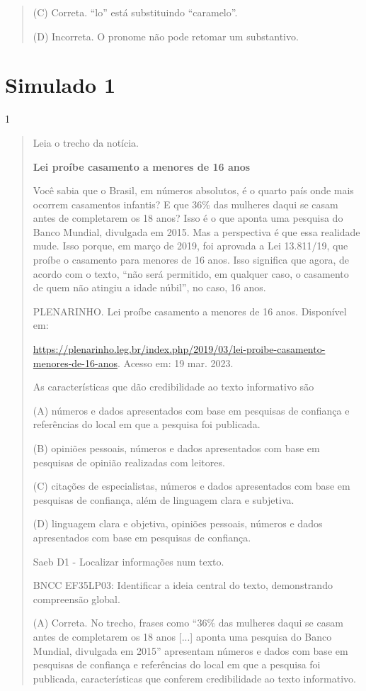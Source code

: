 \begin{escolha}
\begin{quote}
(C) Correta. ``lo'' está substituindo ``caramelo''.

(D) Incorreta. O pronome não pode retomar um substantivo.
\end{quote}

\chapter{Simulado 1}

\num{1}

\begin{quote}
Leia o trecho da notícia.

\textbf{Lei proíbe casamento a menores de 16 anos}

Você sabia que o Brasil, em números absolutos, é o quarto país onde mais
ocorrem casamentos infantis? E que 36\% das mulheres daqui se casam
antes de completarem os 18 anos? Isso é o que aponta uma pesquisa do
Banco Mundial, divulgada em 2015. Mas a perspectiva é que essa realidade
mude. Isso porque, em março de 2019, foi aprovada a Lei 13.811/19, que
proíbe o casamento para menores de 16 anos. Isso significa que agora, de
acordo com o texto, ``não será permitido, em qualquer caso, o casamento
de quem não atingiu a idade núbil'', no caso, 16 anos.

PLENARINHO. Lei proíbe casamento a menores de 16 anos. Disponível em:

\url{https://plenarinho.leg.br/index.php/2019/03/lei-proibe-casamento-menores-de-16-anos}.
Acesso em: 19 mar. 2023.

As características que dão credibilidade ao texto informativo são

(A) números e dados apresentados com base em pesquisas de confiança e
referências do local em que a pesquisa foi publicada.

(B) opiniões pessoais, números e dados apresentados com base em
pesquisas de opinião realizadas com leitores.

(C) citações de especialistas, números e dados apresentados com base em
pesquisas de confiança, além de linguagem clara e subjetiva.

(D) linguagem clara e objetiva, opiniões pessoais, números e dados
apresentados com base em pesquisas de confiança.

Saeb D1 - Localizar informações num texto.

BNCC EF35LP03: Identificar a ideia central do texto, demonstrando
compreensão global.

(A) Correta. No trecho, frases como ``36\% das mulheres daqui se casam
antes de completarem os 18 anos {[}...{]} aponta uma pesquisa do Banco
Mundial, divulgada em 2015'' apresentam números e dados com base em
pesquisas de confiança e referências do local em que a pesquisa foi
publicada, características que conferem credibilidade ao texto
informativo.


\end{quote}
\end{escolha}
